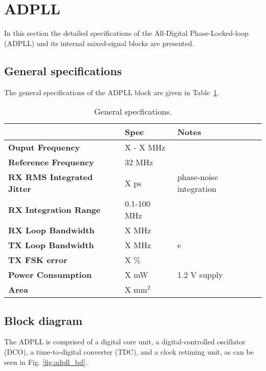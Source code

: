 \section{ADPLL}
\label{sec:adpll}

In this section the detailed specifications of the All-Digital Phase-Locked-loop
(ADPLL) and its internal mixed-signal blocks are presented.


\subsection{General specifications}

The general specifications of the ADPLL block are given in
Table~\ref{tab:adpll_specs}.

\begin{table}[!h]
  \centering
  \begin{tabular}{|p{5cm}|p{2cm}|p{7cm}|}
    \hline
    \rowcolor{tab-green}
    & {\bf Spec} & {\bf Notes} \\
    \hline \hline {\bf Ouput Frequency} & X - X MHz &  \\
    \hline {\bf Reference Frequency} & 32 MHz &   \\
    \hline {\bf RX RMS Integrated Jitter} & X ps & phase-noise integration \\
    \hline {\bf RX Integration Range} & 0.1-100 MHz & \\
    \hline {\bf RX Loop Bandwidth} &  X MHz & \\
    \hline {\bf TX Loop Bandwidth} & X MHz & e \\
    \hline {\bf TX FSK error} & X $\%$ &  \\
    \hline {\bf Power Consumption} &  X mW & 1.2 V supply\\
    \hline {\bf Area} & X mm$^2$ &  \\
    \hline                                   
  \end{tabular}
  \caption{General specfications.}
  \label{tab:adpll_specs}
\end{table}



\subsection{Block diagram}

The ADPLL is comprised of a digital core unit, a digital-controlled
oscillator (DCO), a time-to-digital converter (TDC), and a clock
retiming unit, as can be seen in Fig. \ref{fig:adpll_bd}.

